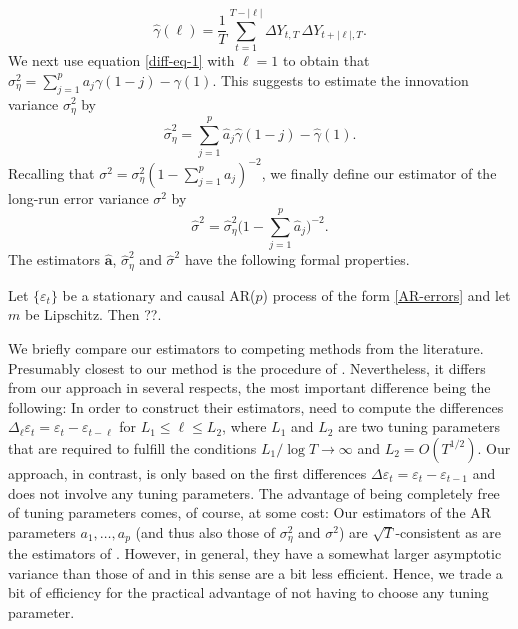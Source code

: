 \begin{equation}\label{est-autocov}
\widehat{\gamma}(\ell) = \frac{1}{T} \sum\limits_{t=1}^{T-|\ell|} \Delta Y_{t,T} \, \Delta Y_{t+|\ell|,T}. 
\end{equation}
We next use equation \eqref{diff-eq-1} with $\ell = 1$ to obtain that $\sigma_\eta^2 = \sum_{j=1}^p a_j \gamma(1-j) - \gamma(1)$. This suggests to estimate the innovation variance $\sigma_\eta^2$ by 
\begin{equation}\label{est-var-eta}
\widehat{\sigma}_\eta^2 = \sum_{j=1}^p \widehat{a}_j \widehat{\gamma}(1-j) - \widehat{\gamma}(1).
\end{equation}
Recalling that $\sigma^2 = \sigma^2_\eta ( 1-\sum_{j=1}^p a_j)^{-2}$, we finally define our estimator of the long-run error variance $\sigma^2$ by 
\begin{equation}\label{est-lrv}
\widehat{\sigma}^2 = \widehat{\sigma}^2_\eta \Big( 1-\sum_{j=1}^p \widehat{a}_j\Big)^{-2}. 
\end{equation}  
The estimators $\widehat{\boldsymbol{a}}$, $\widehat{\sigma}_\eta^2$ and $\widehat{\sigma}^2$ have the following formal properties. 
\begin{prop}\label{prop-lrv}
Let $\{ \varepsilon_t \}$ be a stationary and causal AR($p$) process of the form \eqref{AR-errors} and let $m$ be Lipschitz. Then ??. 
\end{prop}


We briefly compare our estimators to competing methods from the literature. Presumably closest to our method is the procedure of \cite{Hall2003}. Nevertheless, it differs from our approach in several respects, the most important difference being the following: In order to construct their estimators, \cite{Hall2003} need to compute the differences $\Delta_\ell \varepsilon_t = \varepsilon_t - \varepsilon_{t-\ell}$ for $L_1 \le \ell \le L_2$, where $L_1$ and $L_2$ are two tuning parameters that are required to fulfill the conditions $L_1 / \log T \rightarrow \infty$ and $L_2 = O(T^{1/2})$. Our approach, in contrast, is only based on the first differences $\Delta \varepsilon_t = \varepsilon_t - \varepsilon_{t-1}$ and does not involve any tuning parameters. The advantage of being completely free of tuning parameters comes, of course, at some cost: Our estimators of the AR parameters $a_1,\ldots,a_p$ (and thus also those of $\sigma_\eta^2$ and $\sigma^2$) are $\sqrt{T}$-consistent as are the estimators of \cite{Hall2003}. However, in general, they have a somewhat larger asymptotic variance than those of \cite{Hall2003} and in this sense are a bit less efficient. Hence, we trade a bit of efficiency for the practical advantage of not having to choose any tuning parameter. 


